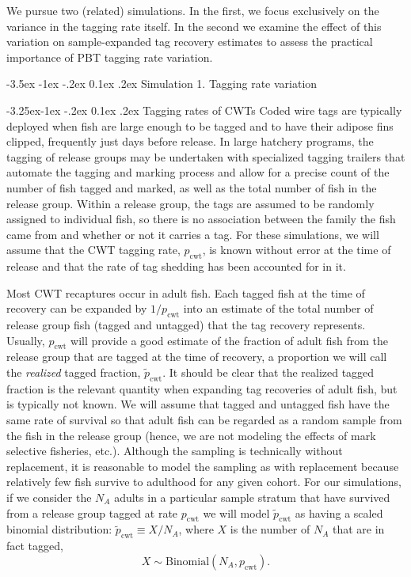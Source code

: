 \documentclass[11pt]{article}
\makeatletter
\renewcommand\section{\@startsection {section}{1}{\z@}%
                                   {-3.5ex \@plus -1ex \@minus -.2ex}%
                                   {0.1ex \@plus.2ex}%
                                   {\normalfont\large\bfseries}}
\renewcommand\subsection{\@startsection{subsection}{2}{\z@}%
                                     {-3.25ex\@plus -1ex \@minus -.2ex}%
                                     {0.1ex \@plus .2ex}%
                                     {\normalfont\normalsize\bfseries}}
\makeatother
\begin{document}
We pursue two (related) simulations.  In the first, we focus  exclusively on the
variance in the tagging rate itself.  In the second we examine the effect of this
variation on sample-expanded tag recovery estimates to assess the practical importance of PBT tagging rate variation.

\section{Simulation 1. Tagging rate variation}

\subsection{Tagging rates of CWTs}
Coded wire tags are typically deployed
when fish are large enough to be tagged and to have their adipose fins clipped, frequently
just days before release.  In large hatchery programs, the tagging of release
groups may be undertaken with specialized tagging trailers that automate the tagging and marking
process and allow for a precise count of the number of fish tagged and marked,
as well as the total number of fish in the release group.  Within a release group, the tags are
assumed to be randomly assigned to individual fish, so there is no association between the family
the fish came from and whether or not it carries a tag.  For these simulations, we will assume
that the CWT tagging rate, $p_\mathrm{cwt}$, is known without error at the time of release and that
the rate of tag shedding has been accounted for in it. 

Most CWT recaptures occur in adult fish.  Each tagged fish at the time of recovery can be
expanded by $1/p_\mathrm{cwt}$ into an estimate of the total number of release group fish (tagged and untagged)  that the tag recovery represents.
Usually, $p_\mathrm{cwt}$ will provide a good estimate of the fraction of adult fish from the release group
that are tagged at the time of recovery, a proportion we will call the {\em realized} tagged
fraction, $\tilde{p}_\mathrm{cwt}$.  It should be clear that the realized
tagged fraction is the relevant quantity when expanding
tag recoveries of adult fish, but is typically not known.  
We will assume that tagged and untagged fish have the same rate of
survival so that adult fish can be regarded as a random sample from the fish in the release group (hence,
we are not modeling the
effects of mark selective fisheries, etc.).
Although the sampling is technically without replacement, it is reasonable to model the sampling as
with replacement because relatively few fish survive to adulthood for any given cohort.  For our simulations, if we consider the
$N_A$ adults in a particular sample stratum that have survived from a release group tagged at rate $p_\mathrm{cwt}$  we will
model $\tilde{p}_\mathrm{cwt}$ as having a scaled binomial distribution:
$	\tilde{p}_\mathrm{cwt} \equiv X/N_A$, where $X$ is the number of $N_A$ that are in fact tagged,
\[
X \sim \mathrm{Binomial}(N_A, p_\mathrm{cwt}).
\]
\end{document}
